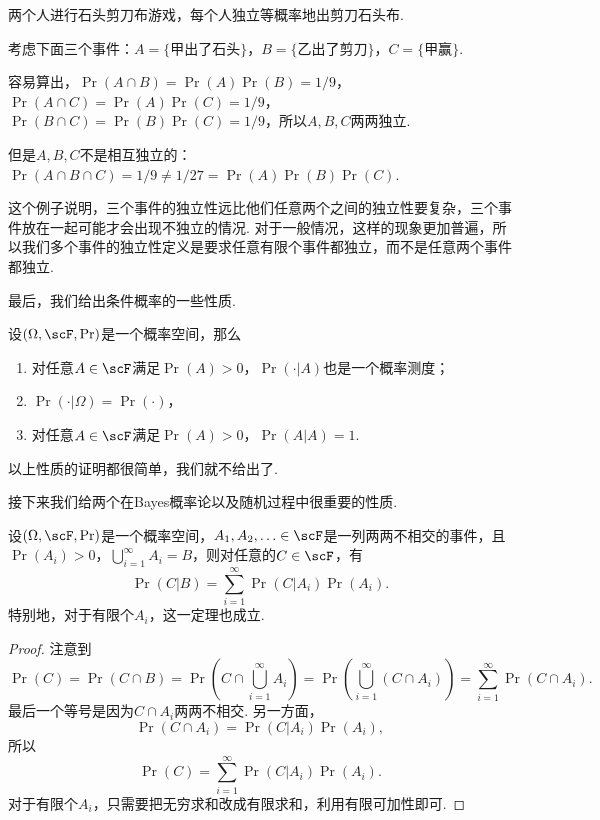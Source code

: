\begin{example}
两个人进行石头剪刀布游戏，每个人独立等概率地出剪刀石头布. 

考虑下面三个事件：$A=\{\text{甲出了石头}\}$，$B=\{\text{乙出了剪刀}\}$，$C=\{\text{甲赢}\}$.

容易算出，$\Pr(A\cap B)=\Pr(A)\Pr(B)=1/9$，$\Pr(A\cap C)=\Pr(A)\Pr(C)=1/9$，$\Pr(B\cap C)=\Pr(B)\Pr(C)=1/9$，所以$A,B,C$两两独立. 

但是$A,B,C$不是相互独立的：$\Pr(A\cap B\cap C)=1/9\neq 1/27=\Pr(A)\Pr(B)\Pr(C)$.
\end{example}

这个例子说明，三个事件的独立性远比他们任意两个之间的独立性要复杂，三个事件放在一起可能才会出现不独立的情况. 对于一般情况，这样的现象更加普遍，所以我们多个事件的独立性定义是要求任意有限个事件都独立，而不是任意两个事件都独立. 

最后，我们给出条件概率的一些性质. 

\begin{proposition}\label{prop:conditional-probability}
设$(\Omega,\scF,\Pr)$是一个概率空间，那么
\begin{enumerate}
    \item 对任意$A\in\scF$满足$\Pr(A)>0$，$\Pr(\cdot|A)$也是一个概率测度；
    \item $\Pr(\cdot|\Omega)=\Pr(\cdot)$，
    \item 对任意$A\in\scF$满足$\Pr(A)>0$，$\Pr(A|A)=1$.
\end{enumerate}
\end{proposition}
以上性质的证明都很简单，我们就不给出了. 

接下来我们给两个在Bayes概率论以及随机过程中很重要的性质. 

\begin{theorem}[全概率公式]\label{thm:total-probability}
设$(\Omega,\scF,\Pr)$是一个概率空间，$A_1,A_2,\ldots\in\scF$是一列两两不相交的事件，且$\Pr(A_i)>0$，$\bigcup_{i=1}^\infty A_i=B$，则对任意的$C\in\scF$，有
\[
    \Pr(C|B) = \sum_{i=1}^\infty \Pr(C|A_i)\Pr(A_i).
\]
特别地，对于有限个$A_i$，这一定理也成立. 
\end{theorem}
\begin{proof}
注意到
\[
    \Pr(C) = \Pr(C\cap B) = \Pr\left(C\cap\bigcup_{i=1}^\infty A_i\right) = \Pr\left(\bigcup_{i=1}^\infty (C\cap A_i)\right) = \sum_{i=1}^\infty \Pr(C\cap A_i).
\]
最后一个等号是因为$C\cap A_i$两两不相交. 另一方面，
\[
    \Pr(C\cap A_i) = \Pr(C|A_i)\Pr(A_i),
\]
所以
\[
    \Pr(C) = \sum_{i=1}^\infty \Pr(C|A_i)\Pr(A_i).
\]
对于有限个$A_i$，只需要把无穷求和改成有限求和，利用有限可加性即可. 
\end{proof}

